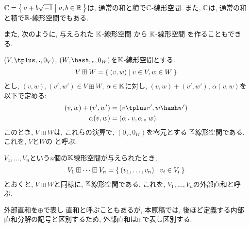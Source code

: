 

\begin{example}
\label{ex:c:real:vecs}
  $\mathbb{C}=\Set{a+b\sqrt{-1}|a,b\in \mathbb{R}}$は,
  通常の和と積で$\mathbb{C}$-線形空間.
  また,
  $\mathbb{C}$は,
  通常の和と積で$\mathbb{R}$-線形空間でもある.
\end{example}




また,
次のように,
与えられた
$\mathbb{K}$-線形空間
から
$\mathbb{K}$-線形空間
を作ることもできる.
\begin{example}
  $(V,\plus,\act,0_V)$, $(W,\pplus,\aact,0_W)$を$\mathbb{K}$-線形空間とする.
\begin{align*}
V\boxplus W = \Set{(v,w)|v\in V, w\in W}
\end{align*}
とし, $(v,w),(v',w')\in V\boxplus W$, $\alpha\in\mathbb{K}$に対し,
$(v,w)+(v',w')$, $\alpha(v,w)$を以下で定める:
\begin{align*}
(v,w)+(v',w')&=(v\plus v', w\pplus w')\\
\alpha(v,w)&=(\alpha\act v,\alpha\aact w).
\end{align*}
このとき,
$V\boxplus W$は, これらの演算で, $(0_V,0_W)$を零元とする
$\mathbb{K}$線形空間である.
これを,
$V$と$W$の
%
%
と呼ぶ.

$V_1,\ldots, V_n$という$n$個の$\mathbb{K}$線形空間が与えられたとき,
\begin{align*}
V_1\boxplus \cdots \boxplus V_n = \Set{(v_1,\ldots,v_n)|v_i\in V_i}
\end{align*}
とおくと,
$V\boxplus W$と同様に,
$\mathbb{K}$線形空間である.
これを, 
$V_1,\ldots, V_n$の外部直和と呼ぶ.
\end{example}
\begin{remark}
外部直和を$\oplus$で表し
直和と呼ぶこともあるが,
本原稿では,
後ほど定義する内部直和分解の記号と区別するため,
外部直和は$\boxplus$で表し区別する.
\end{remark}


